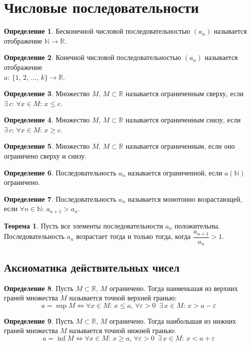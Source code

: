 \documentclass[12pt]{article}
\theoremstyle{definition}
\newtheorem{theorem}{Теорема}[section]
\newtheorem{definition}{Определение}
\newcommand{\N}{\mathbb{N}}
\newcommand{\R}{\mathbb{R}}
\begin{document}
\section{Числовые последовательности}
\begin{definition}
    Бесконечной числовой последовательностью $(a_n)$ называется отображение $\N \to \R$.
\end{definition}
\begin{definition}
    Конечной числовой последовательностью $(a_n)$ называется отображение\\ $a:\,\{1,\,2,\,\ldots,\,k\}\to \R$.
\end{definition}

\begin{definition}
    Множество $M,\,M\subset\R$ называется ограниченным сверху, если $\exists\, c:\,\forall x\in M:\,x \leq c$.
\end{definition}
\begin{definition}
    Множество $M,\,M\subset\R$ называется ограниченным снизу, если $\exists\, c:\,\forall x\in M:\,x \geq c$.
\end{definition}
\begin{definition}
    Множество $M,\,M\subset\R$ называется ограниченным, если оно ограничено сверху и снизу.
\end{definition}
\begin{definition}
    Последовательность $a_n$ называется ограниченной, если $a(\N)$ ограничено. 
\end{definition}
\begin{definition}
    Последовательность $a_n$ называется монотонно возрастающей, если $\forall n \in \N:\, a_{n+1}>a_n$.
\end{definition}
\begin{theorem}
    Пусть все элементы последовательности $a_n$ положительны. Последовательность $a_n$ возрастает тогда и только тогда, когда $\dfrac{a_{n+1}}{a_n}>1$.
\end{theorem}

\subsection{Аксиоматика действительных чисел}

\begin{definition}
    Пусть $M \subset \R,\,M$ ограничено. Тогда наименьшая из верхних граней множества $M$ называется точной верхней гранью:
    $$a=\sup M\Longleftrightarrow \forall x \in M:\, x \leq a,\, \forall \varepsilon>0\,\,\, \exists\, x \in M:\, x>a-\varepsilon$$
\end{definition}
\begin{definition}
    Пусть $M \subset \R,\,M$ ограничено. Тогда наибольшая из нижних граней множества $M$ называется точной нижней гранью:
    $$a=\inf M\Longleftrightarrow \forall x \in M:\, x \geq a,\, \forall \varepsilon>0\,\,\, \exists\, x \in M:\, x<a+\varepsilon$$
\end{definition}
\end{document}
